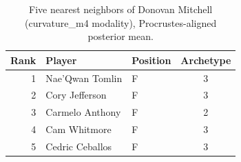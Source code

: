 \begin{table}[htbp]
  \centering\small
  \begin{tabular}{rllc}
    \toprule
    Rank & Player & Position & Archetype \\
    \midrule
    1 & Nae'Qwan Tomlin & F & 3 \\
    2 & Cory Jefferson & F & 3 \\
    3 & Carmelo Anthony & F & 2 \\
    4 & Cam Whitmore & F & 3 \\
    5 & Cedric Ceballos & F & 3 \\
    \bottomrule
  \end{tabular}
  \caption{Five nearest neighbors of Donovan Mitchell (curvature_m4 modality), Procrustes-aligned posterior mean.}
  \label{tab:Donovan_Mitchell_neighbors_curvature_m4}
\end{table}

